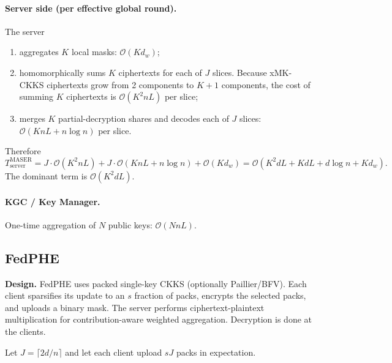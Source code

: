 \documentclass[a4paper,11pt]{article}
\begin{document}
\paragraph{Server side (per effective global round).} The server
\begin{enumerate}
    \item aggregates $K$ local masks: $\mathcal{O}(K d_w)$;
    \item homomorphically sums $K$ ciphertexts for each of $J$ slices. Because xMK-CKKS ciphertexts grow from 2 components to $K+1$ components, the cost of summing $K$ ciphertexts is $\mathcal{O}(K^2 n L)$ per slice;
    \item merges $K$ partial-decryption shares and decodes each of $J$ slices: $\mathcal{O}(K n L + n\log n)$ per slice.
\end{enumerate}
Therefore
\begin{equation}
\boxed{T_{\text{server}}^{\text{MASER}} = J\cdot\mathcal{O}(K^2 nL) + J\cdot\mathcal{O}(KnL + n\log n) + \mathcal{O}(Kd_w) = \mathcal{O}(K^2 dL + KdL + d\log n + Kd_w).}
\end{equation}
The dominant term is $\mathcal{O}(K^2 dL)$.

\paragraph{KGC / Key Manager.} One-time aggregation of $N$ public keys: $\mathcal{O}(N n L)$.

\subsection{FedPHE}
\label{ssec:fedphe}

\textbf{Design.} FedPHE uses packed single-key CKKS (optionally Paillier/BFV). Each client sparsifies its update to an $s$ fraction of packs, encrypts the selected packs, and uploads a binary mask. The server performs ciphertext-plaintext multiplication for contribution-aware weighted aggregation. Decryption is done at the clients.

Let $J=\lceil 2d/n\rceil$ and let each client upload $sJ$ packs in expectation.
\end{document}
